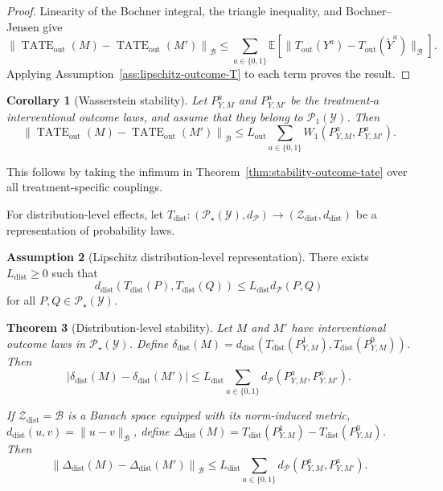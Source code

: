 \documentclass[11pt,a4paper]{article}
\theoremstyle{plain}
\newtheorem{theorem}{Theorem}[section]
\newtheorem{corollary}[theorem]{Corollary}
\theoremstyle{definition}
\newtheorem{assumption}[theorem]{Assumption}
\theoremstyle{remark}
\newcommand{\1}{\mathbbm{1}}
\begin{document}
\begin{proof}
Linearity of the Bochner integral, the triangle inequality, and Bochner--Jensen give
\[
\left\|
\operatorname{TATE}_{\mathrm{out}}(M)
-
\operatorname{TATE}_{\mathrm{out}}(M')
\right\|_{\mathcal B}
\leq
\sum_{a\in\{0,1\}}
\mathbb E\left[
\|T_{\mathrm{out}}(Y^a)
-
T_{\mathrm{out}}(\widetilde Y^a)\|_{\mathcal B}
\right].
\]
Applying Assumption~\ref{ass:lipschitz-outcome-T} to each term proves the result.
\end{proof}

\begin{corollary}[Wasserstein stability]
\label{cor:wasserstein-outcome-stability}
Let \(P_{Y,M}^a\) and \(P_{Y,M'}^a\) be the treatment-\(a\) interventional outcome laws, and assume that they belong to
\(\mathcal P_1(\mathcal Y)\). Then
\[
\left\|
\operatorname{TATE}_{\mathrm{out}}(M)
-
\operatorname{TATE}_{\mathrm{out}}(M')
\right\|_{\mathcal B}
\leq
L_{\mathrm{out}}
\sum_{a\in\{0,1\}}
W_1(P_{Y,M}^a, P_{Y,M'}^a).
\]
\end{corollary}

This follows by taking the infimum in
Theorem~\ref{thm:stability-outcome-tate} over all treatment-specific couplings.

\smallbreak 

For distribution-level effects, let
\(T_{\mathrm{dist}}:
(\mathcal P_\star(\mathcal Y),d_{\mathcal P})
\longrightarrow
(\mathcal Z_{\mathrm{dist}},d_{\mathrm{dist}})
\) be a representation of probability laws.

\begin{assumption}[Lipschitz distribution-level representation]
\label{ass:lipschitz-distribution-T}
There exists \(L_{\mathrm{dist}}\geq0\) such that
\[
d_{\mathrm{dist}}\left(
T_{\mathrm{dist}}(P),
T_{\mathrm{dist}}(Q)
\right)
\leq
L_{\mathrm{dist}}d_{\mathcal P}(P,Q)
\]
for all \(P,Q\in\mathcal P_\star(\mathcal Y)\).
\end{assumption}

\begin{theorem}[Distribution-level stability]
\label{thm:distribution-stability}
Let \(M\) and \(M'\) have interventional outcome laws in
\(\mathcal P_\star(\mathcal Y)\). Define
\(\delta_{\mathrm{dist}}(M) = d_{\mathrm{dist}}\left(
T_{\mathrm{dist}}(P_{Y,M}^1), T_{\mathrm{dist}}(P_{Y,M}^0)
\right)\). Then
\[
\left|
\delta_{\mathrm{dist}}(M)
-
\delta_{\mathrm{dist}}(M')
\right|
\leq
L_{\mathrm{dist}}
\sum_{a\in\{0,1\}}
d_{\mathcal P}(P_{Y,M}^a,P_{Y,M'}^a).
\]

If \(\mathcal Z_{\mathrm{dist}}=\mathcal B\) is a Banach space
equipped with its norm-induced metric, \(d_{\mathrm{dist}}(u,v)=\|u-v\|_{\mathcal B}\), define
\(\Delta_{\mathrm{dist}}(M) = T_{\mathrm{dist}}(P_{Y,M}^1)
- T_{\mathrm{dist}}(P_{Y,M}^0)\). Then
\[
\left\|
\Delta_{\mathrm{dist}}(M)
-
\Delta_{\mathrm{dist}}(M')
\right\|_{\mathcal B}
\leq
L_{\mathrm{dist}}
\sum_{a\in\{0,1\}}
d_{\mathcal P}(P_{Y,M}^a,P_{Y,M'}^a).
\]
\end{theorem}
\end{document}
